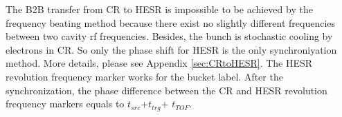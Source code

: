 The B2B transfer from CR to HESR is impossible to be achieved by the frequency beating method because there exist no slightly different frequencies between two cavity rf frequencies. Besides, the bunch is stochastic cooling by electrons in CR. So only the phase shift for HESR is the only synchroniyation method. More details, please see Appendix \ref{sec:CRtoHESR}. The HESR revolution frequency marker works for the bucket label. After the synchronization, the phase difference between the CR and HESR revolution frequency markers equals to $t_{src}$+$t_{trg}$+ $t_{TOF}$.
